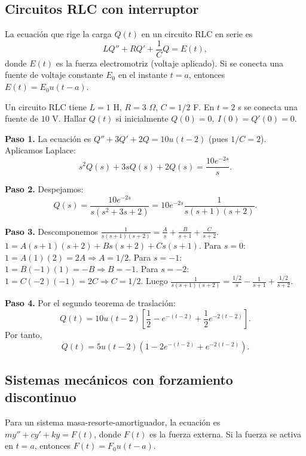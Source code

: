 \subsection{Circuitos RLC con interruptor}

\begin{rem}
La ecuación que rige la carga $Q(t)$ en un circuito RLC en serie es
\[
L Q'' + R Q' + \frac{1}{C}Q = E(t),
\]
donde $E(t)$ es la fuerza electromotriz (voltaje aplicado). Si se conecta una fuente de voltaje constante $E_0$ en el instante $t=a$, entonces $E(t)=E_0 u(t-a)$.
\end{rem}

\begin{example}
Un circuito RLC tiene $L=1$ H, $R=3$ $\Omega$, $C=1/2$ F. En $t=2$ s se conecta una fuente de $10$ V. Hallar $Q(t)$ si inicialmente $Q(0)=0,\ I(0)=Q'(0)=0$.
\begin{myproof}
\textbf{Paso 1.} La ecuación es $Q'' + 3Q' + 2Q = 10 u(t-2)$ (pues $1/C = 2$). Aplicamos Laplace:
\[
s^2Q(s) + 3sQ(s) + 2Q(s) = \frac{10 e^{-2s}}{s}.
\]

\textbf{Paso 2.} Despejamos:
\[
Q(s) = \frac{10 e^{-2s}}{s(s^2+3s+2)} = 10 e^{-2s}\frac{1}{s(s+1)(s+2)}.
\]

\textbf{Paso 3.} Descomponemos $\frac{1}{s(s+1)(s+2)} = \frac{A}{s} + \frac{B}{s+1} + \frac{C}{s+2}$.
$1 = A(s+1)(s+2) + B s(s+2) + C s(s+1)$.
Para $s=0$: $1 = A(1)(2)=2A \Rightarrow A=1/2$.
Para $s=-1$: $1 = B(-1)(1) = -B \Rightarrow B=-1$.
Para $s=-2$: $1 = C(-2)(-1)=2C \Rightarrow C=1/2$.
Luego $\frac{1}{s(s+1)(s+2)} = \frac{1/2}{s} - \frac{1}{s+1} + \frac{1/2}{s+2}$.

\textbf{Paso 4.} Por el segundo teorema de traslación:
\[
Q(t) = 10 u(t-2)\left[ \frac{1}{2} - e^{-(t-2)} + \frac{1}{2}e^{-2(t-2)} \right].
\]
Por tanto,
\[
\boxed{Q(t) = 5u(t-2)\left(1 - 2e^{-(t-2)} + e^{-2(t-2)}\right).}
\]
\end{myproof}
\end{example}

\subsection{Sistemas mecánicos con forzamiento discontinuo}

\begin{rem}
Para un sistema masa-resorte-amortiguador, la ecuación es $m y'' + c y' + k y = F(t)$, donde $F(t)$ es la fuerza externa. Si la fuerza se activa en $t=a$, entonces $F(t)=F_0 u(t-a)$.
\end{rem}

